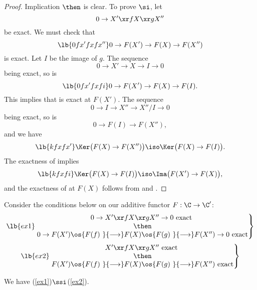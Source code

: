 \documentclass[12pt]{article}
\theoremstyle{remark}
\theoremstyle{definition}
\begin{document}
\begin{proof}
Implication $\then$ is clear. To prove $\si$, let 
$$
0\to X'\xr fX\xr gX''
$$
be exact. We must check that 
%
\begin{equation}\lb{0fx'fxfx''}
0\to F(X')\to F(X)\to F(X'')
\end{equation} 
% 
is exact. Let $I$ be the image of $g$. The sequence 
$$ 
0\to X'\to X\to I\to0
$$ 
being exact, so is 
%
\begin{equation}\lb{0fx'fxfi}
0\to F(X')\to F(X)\to F(I).
\end{equation} 
% 
This implies that  is exact at $F(X')$. The sequence 
$$ 
0\to I\to X''\to X''/I\to0
$$  
being exact, so is 
$$ 
0\to F(I)\to F(X''),
$$  
and we have 
%
\begin{equation}\lb{kfxfx'}
\Ker\big(F(X)\to F(X'')\big)\iso\Ker\big(F(X)\to F(I)\big).
\end{equation} 
% 
The exactness of  implies 
%
\begin{equation}\lb{kfxfi}
\Ker\big(F(X)\to F(I)\big)\iso\Ima\big(F(X')\to F(X)\big), 
\end{equation} 
% 
and the exactness of  at $F(X)$ follows from  and . 
\end{proof} 

Consider the conditions below on our additive functor $F:\C\to\C'$:
%
\begin{equation}\lb{ex1}
\left.
\begin{matrix}
0\to X'\xr fX\xr gX''\to0\text{ exact }\\ 
\then\\ 
0\to F(X')\os{F(f)\ }{\longrightarrow}F(X)\os{F(g)\ }{\longrightarrow}F(X'')\to0\text{ exact}
\end{matrix}
\right\}
\end{equation}
%
\begin{equation}\lb{ex2}
\left.
\begin{matrix}
X'\xr fX\xr gX''\text{ exact }\\ 
\then\\ 
F(X')\os{F(f)\ }{\longrightarrow}F(X)\os{F(g)\ }{\longrightarrow}F(X'')\text{ exact}
\end{matrix}
\right\}
\end{equation}

\begin{lem}
We have (\ref{ex1})$\ssi$(\ref{ex2}).
\end{lem}
\end{document}
